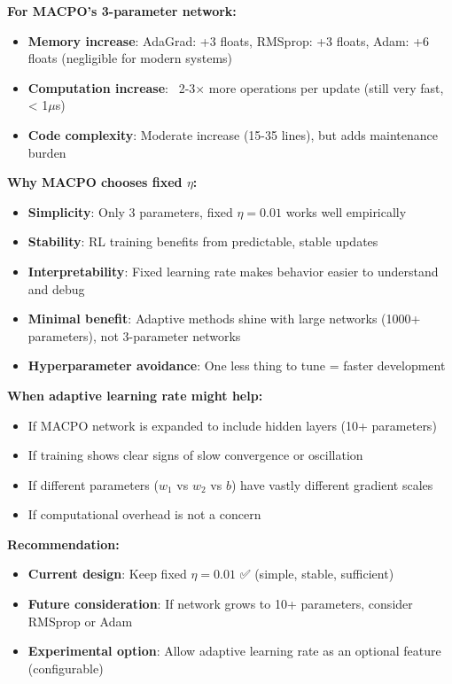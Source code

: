 \documentclass[11pt,a4paper]{article}
\begin{document}
\begin{itemize}
\textbf{For MACPO's 3-parameter network:}
\begin{itemize}
    \item \textbf{Memory increase}: AdaGrad: +3 floats, RMSprop: +3 floats, Adam: +6 floats (negligible for modern systems)
    \item \textbf{Computation increase}: ~2-3× more operations per update (still very fast, < 1$\mu$s)
    \item \textbf{Code complexity}: Moderate increase (15-35 lines), but adds maintenance burden
\end{itemize}

\textbf{Why MACPO chooses fixed $\eta$:}
\begin{itemize}
    \item \textbf{Simplicity}: Only 3 parameters, fixed $\eta = 0.01$ works well empirically
    \item \textbf{Stability}: RL training benefits from predictable, stable updates
    \item \textbf{Interpretability}: Fixed learning rate makes behavior easier to understand and debug
    \item \textbf{Minimal benefit}: Adaptive methods shine with large networks (1000+ parameters), not 3-parameter networks
    \item \textbf{Hyperparameter avoidance}: One less thing to tune = faster development
\end{itemize}

\textbf{When adaptive learning rate might help:}
\begin{itemize}
    \item If MACPO network is expanded to include hidden layers (10+ parameters)
    \item If training shows clear signs of slow convergence or oscillation
    \item If different parameters ($w_1$ vs $w_2$ vs $b$) have vastly different gradient scales
    \item If computational overhead is not a concern
\end{itemize}

\textbf{Recommendation:}
\begin{itemize}
    \item \textbf{Current design}: Keep fixed $\eta = 0.01$ ✅ (simple, stable, sufficient)
    \item \textbf{Future consideration}: If network grows to 10+ parameters, consider RMSprop or Adam
    \item \textbf{Experimental option}: Allow adaptive learning rate as an optional feature (configurable)
\end{itemize}


\end{itemize}
\end{document}
